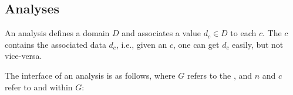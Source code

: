 



\subsection{\Eclass Analyses}
\label{sec:analysis}

An \eclass analysis defines a domain $D$ and associates a value $d_{c} \in D$ to
  each \eclass $c$.
The \eclass $c$ contains the associated data $d_{c}$,
  i.e., given an \eclass $c$, one can get $d_{c}$ easily, but not vice-versa.

The interface of an \eclass analysis is as follows,
  where $G$ refers to the \egraph,
  and $n$ and $c$ refer to \enodes and \eclasses within $G$:


